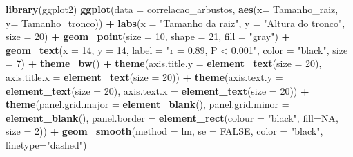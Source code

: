 \documentclass[
]{book}
\newenvironment{Shaded}{\begin{snugshade}}{\end{snugshade}}
\newcommand{\DataTypeTok}[1]{\textcolor[rgb]{0.13,0.29,0.53}{#1}}
\newcommand{\DecValTok}[1]{\textcolor[rgb]{0.00,0.00,0.81}{#1}}
\newcommand{\KeywordTok}[1]{\textcolor[rgb]{0.13,0.29,0.53}{\textbf{#1}}}
\newcommand{\NormalTok}[1]{#1}
\newcommand{\OperatorTok}[1]{\textcolor[rgb]{0.81,0.36,0.00}{\textbf{#1}}}
\newcommand{\OtherTok}[1]{\textcolor[rgb]{0.56,0.35,0.01}{#1}}
\newcommand{\StringTok}[1]{\textcolor[rgb]{0.31,0.60,0.02}{#1}}
\begin{document}
\begin{Shaded}
\begin{Highlighting}[]
\KeywordTok{library}\NormalTok{(ggplot2)}
\KeywordTok{ggplot}\NormalTok{(}\DataTypeTok{data =}\NormalTok{ correlacao_arbustos, }\KeywordTok{aes}\NormalTok{(}\DataTypeTok{x=}\NormalTok{ Tamanho_raiz, }\DataTypeTok{y=}\NormalTok{ Tamanho_tronco)) }\OperatorTok{+}\StringTok{ }
\StringTok{  }\KeywordTok{labs}\NormalTok{(}\DataTypeTok{x =} \StringTok{"Tamanho da raiz"}\NormalTok{, }\DataTypeTok{y =} \StringTok{"Altura do tronco"}\NormalTok{, }\DataTypeTok{size =} \DecValTok{20}\NormalTok{) }\OperatorTok{+}
\StringTok{  }\KeywordTok{geom_point}\NormalTok{(}\DataTypeTok{size =} \DecValTok{10}\NormalTok{, }\DataTypeTok{shape =} \DecValTok{21}\NormalTok{, }\DataTypeTok{fill =} \StringTok{"gray"}\NormalTok{) }\OperatorTok{+}
\StringTok{  }\KeywordTok{geom_text}\NormalTok{(}\DataTypeTok{x =} \DecValTok{14}\NormalTok{, }\DataTypeTok{y =} \DecValTok{14}\NormalTok{, }\DataTypeTok{label =} \StringTok{"r = 0.89, P < 0.001"}\NormalTok{, }\DataTypeTok{color =} \StringTok{"black"}\NormalTok{, }\DataTypeTok{size =} \DecValTok{7}\NormalTok{) }\OperatorTok{+}
\StringTok{  }\KeywordTok{theme_bw}\NormalTok{() }\OperatorTok{+}
\StringTok{  }\KeywordTok{theme}\NormalTok{(}\DataTypeTok{axis.title.y =} \KeywordTok{element_text}\NormalTok{(}\DataTypeTok{size =} \DecValTok{20}\NormalTok{), }\DataTypeTok{axis.title.x =} \KeywordTok{element_text}\NormalTok{(}\DataTypeTok{size =} \DecValTok{20}\NormalTok{)) }\OperatorTok{+}
\StringTok{  }\KeywordTok{theme}\NormalTok{(}\DataTypeTok{axis.text.y =} \KeywordTok{element_text}\NormalTok{(}\DataTypeTok{size =} \DecValTok{20}\NormalTok{), }\DataTypeTok{axis.text.x =} \KeywordTok{element_text}\NormalTok{(}\DataTypeTok{size =} \DecValTok{20}\NormalTok{)) }\OperatorTok{+}
\StringTok{  }\KeywordTok{theme}\NormalTok{(}\DataTypeTok{panel.grid.major =} \KeywordTok{element_blank}\NormalTok{(), }\DataTypeTok{panel.grid.minor =} \KeywordTok{element_blank}\NormalTok{(), }
        \DataTypeTok{panel.border =} \KeywordTok{element_rect}\NormalTok{(}\DataTypeTok{colour =} \StringTok{"black"}\NormalTok{, }\DataTypeTok{fill=}\OtherTok{NA}\NormalTok{, }\DataTypeTok{size =} \DecValTok{2}\NormalTok{)) }\OperatorTok{+}
\StringTok{  }\KeywordTok{geom_smooth}\NormalTok{(}\DataTypeTok{method =}\NormalTok{ lm, }\DataTypeTok{se =} \OtherTok{FALSE}\NormalTok{, }\DataTypeTok{color =} \StringTok{"black"}\NormalTok{, }\DataTypeTok{linetype=}\StringTok{"dashed"}\NormalTok{) }
\end{Highlighting}
\end{Shaded}
\end{document}

